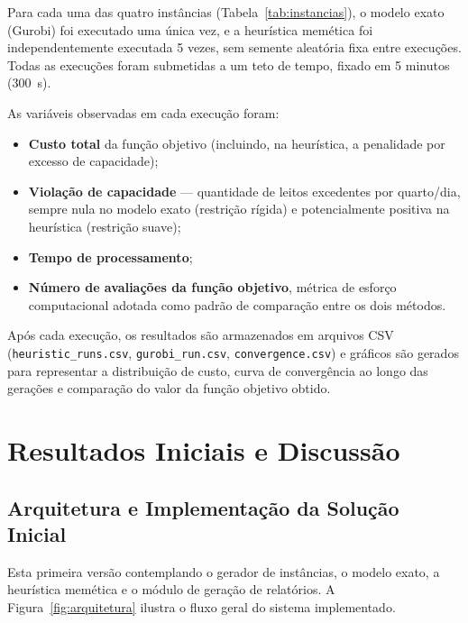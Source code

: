 \documentclass[12pt,a4paper]{article}
\begin{document}
Para cada uma das quatro instâncias (Tabela~\ref{tab:instancias}), o modelo exato
(Gurobi) foi executado uma única vez, e a heurística memética foi independentemente executada
5 vezes, sem semente aleatória fixa entre execuções. Todas as execuções foram submetidas a um
teto de tempo, fixado em 5 minutos (300~s).

As variáveis observadas em cada execução foram:

\begin{itemize}
    \item \textbf{Custo total} da função objetivo (incluindo, na heurística, a
    penalidade por excesso de capacidade);
    \item \textbf{Violação de capacidade} — quantidade de leitos excedentes por
    quarto/dia, sempre nula no modelo exato (restrição rígida) e potencialmente
    positiva na heurística (restrição suave);
    \item \textbf{Tempo de processamento};
    \item \textbf{Número de avaliações da função objetivo}, métrica de esforço
    computacional adotada como padrão de comparação entre os dois métodos.
\end{itemize}

Após cada execução, os resultados são armazenados em arquivos CSV (\texttt{heuristic\_runs.csv},
\texttt{gurobi\_run.csv}, \texttt{convergence.csv}) e gráficos são gerados para representar a distribuição de custo, curva de convergência ao longo das gerações e
comparação do valor da função objetivo obtido.

\section{Resultados Iniciais e Discussão}

\subsection{Arquitetura e Implementação da Solução Inicial}

Esta primeira versão contemplando o
gerador de instâncias, o modelo exato, a heurística memética e o módulo de
geração de relatórios. A Figura~\ref{fig:arquitetura} ilustra o fluxo geral do
sistema implementado.
\end{document}
